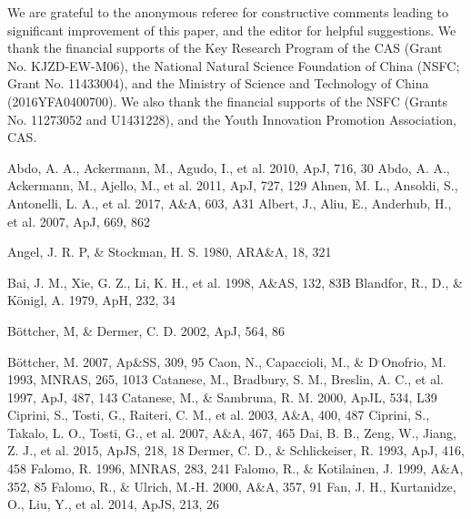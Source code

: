 \documentclass[structabstract]{raa}
\begin{document}
\begin{acknowledgements}
 We are grateful to the anonymous referee for constructive comments leading to significant improvement of this paper, and the editor for
 helpful suggestions. We thank the financial supports of the Key Research Program of the CAS (Grant No. KJZD-EW-M06), the National Natural Science Foundation of China (NSFC; Grant No. 11433004), and the Ministry of Science and Technology of China (2016YFA0400700). We also thank the financial supports of the NSFC (Grants No. 11273052 and U1431228), and the Youth Innovation Promotion Association, CAS.

\end{acknowledgements}

\begin{thebibliography}{99}\label{thebibliography}

 Abdo, A. A., Ackermann, M., Agudo, I., et al. 2010, ApJ, 716, 30
 Abdo, A. A., Ackermann, M., Ajello, M., et al. 2011, ApJ, 727, 129
 Ahnen, M. L., Ansoldi, S., Antonelli, L. A., et al. 2017, A\&A, 603, A31
 Albert, J., Aliu, E., Anderhub, H., et al. 2007, ApJ, 669, 862

  Angel, J. R. P, \& Stockman, H. S. 1980, ARA\&A, 18, 321

 Bai, J. M., Xie, G. Z., Li, K. H., et al. 1998, A\&AS, 132, 83B
 Blandfor, R., D., \& K\"{o}nigl, A. 1979, ApH, 232, 34

  B\"{o}ttcher, M, \& Dermer, C. D. 2002, ApJ, 564, 86

 B\"{o}ttcher, M. 2007, Ap\&SS, 309, 95
 Caon, N., Capaccioli, M., \& D$^{,}$Onofrio, M. 1993, MNRAS, 265, 1013
 Catanese, M., Bradbury, S. M., Breslin, A. C., et al. 1997, ApJ, 487, 143
 Catanese, M., \& Sambruna, R. M. 2000, ApJL, 534, L39
 Ciprini, S., Tosti, G., Raiteri, C. M., et al. 2003, A\&A, 400, 487
 Ciprini, S., Takalo, L. O., Tosti, G., et al. 2007, A\&A, 467, 465
 Dai, B. B., Zeng, W., Jiang, Z. J., et al. 2015, ApJS, 218, 18
 Dermer, C. D., \& Schlickeiser, R. 1993, ApJ, 416, 458
 Falomo, R. 1996, MNRAS, 283, 241
 Falomo, R., \& Kotilainen, J. 1999, A\&A, 352, 85
 Falomo, R., \& Ulrich, M.-H. 2000, A\&A, 357, 91
 Fan, J. H., Kurtanidze, O., Liu, Y., et al. 2014, ApJS, 213, 26


\end{thebibliography}
\end{document}
